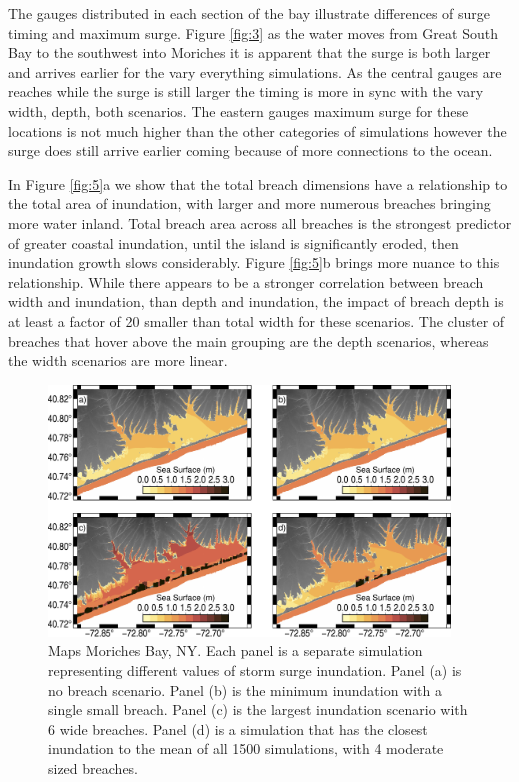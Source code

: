 \documentclass{coastal_paper}
\begin{document}
The gauges distributed in each section of the bay illustrate differences of surge timing and maximum surge. Figure \ref{fig:3} as the water moves from Great South Bay to the southwest into Moriches it is apparent that the surge is both larger and arrives earlier for the vary everything simulations. As the central gauges are reaches while the surge is still larger the timing is more in sync with the vary width, depth, both scenarios. The eastern gauges maximum surge for these locations is not much higher than the other categories of simulations however the surge does still arrive earlier coming because of more connections to the ocean.

In Figure \ref{fig:5}a we show that the total breach dimensions have a relationship to the total area of inundation, with larger and more numerous breaches bringing more water inland. Total breach area across all breaches is the strongest predictor of greater coastal inundation, until the island is significantly eroded, then inundation growth slows considerably.
Figure \ref{fig:5}b brings more nuance to this relationship. While there appears to be a stronger correlation between breach width and inundation, than depth and inundation, the impact of breach depth is at least a factor of 20 smaller than total width for these scenarios. The cluster of breaches that hover above the main grouping are the depth scenarios, whereas the width scenarios are more linear.

\begin{figure}
    \centering
    \includegraphics[width=0.95\textwidth]{figures/fig6.pdf}

    \caption{Maps Moriches Bay, NY. Each panel is a separate simulation representing different values of storm surge inundation. Panel (a) is no breach scenario. Panel (b) is the minimum inundation with a single small breach. Panel (c) is the largest inundation scenario with 6 wide breaches. Panel (d)  is a simulation that has the closest inundation to the mean of all 1500 simulations, with 4 moderate sized breaches.}
    \label{fig:6}
\end{figure}
\end{document}
